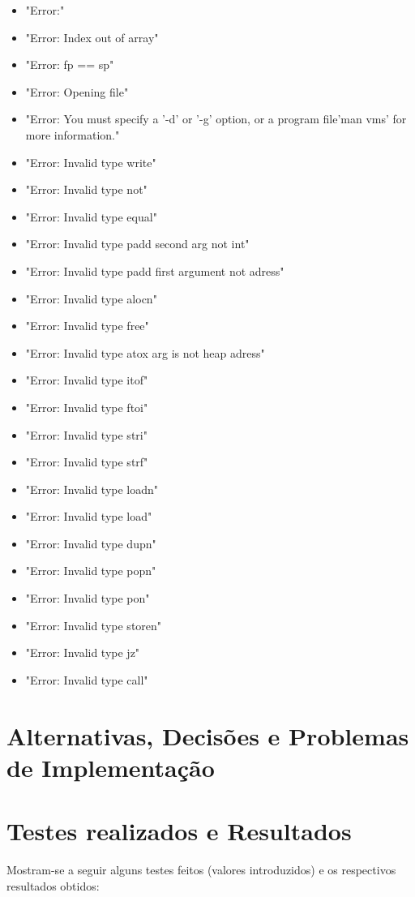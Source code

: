 \documentclass{report}
\begin{document}
\begin{itemize}
\item "Error:"
\item "Error: Index out of array"
\item "Error: fp == sp"
\item "Error: Opening file"
\item "Error: You must specify a '-d' or '-g' option, or a program file\nTry 'man vms' for more information.\n"
\item "Error: Invalid type write"
\item "Error: Invalid type not"
\item "Error: Invalid type equal"
\item "Error: Invalid type padd second arg not int"
\item "Error: Invalid type padd first argument not adress"
\item "Error: Invalid type alocn"
\item "Error: Invalid type free"
\item "Error: Invalid type atox arg is not heap adress"
\item "Error: Invalid type itof"
\item "Error: Invalid type ftoi"
\item "Error: Invalid type stri"
\item "Error: Invalid type strf"
\item "Error: Invalid type loadn"
\item "Error: Invalid type load"
\item "Error: Invalid type dupn"
\item "Error: Invalid type popn"
\item "Error: Invalid type pon"
\item "Error: Invalid type storen"
\item "Error: Invalid type jz"
\item "Error: Invalid type call"
\end{itemize}

\section{Alternativas, Decisões e Problemas de Implementação}
\section{Testes realizados e Resultados}
Mostram-se a seguir alguns testes feitos (valores introduzidos) e
os respectivos resultados obtidos:
\end{document}

